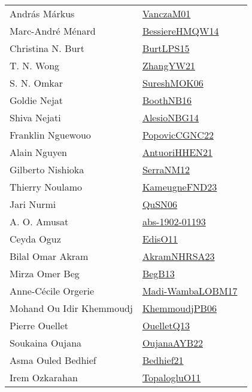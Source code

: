 {\begin{longtable}{p{4cm}p{20cm}}
Andr{\'{a}}s M{\'{a}}rkus & \href{works/VanczaM01.pdf}{VanczaM01}~\cite{VanczaM01}\\
Marc{-}Andr{\'{e}} M{\'{e}}nard & \href{works/BessiereHMQW14.pdf}{BessiereHMQW14}~\cite{BessiereHMQW14}\\
Christina N. Burt & \href{works/BurtLPS15.pdf}{BurtLPS15}~\cite{BurtLPS15}\\
T. N. Wong & \href{works/ZhangYW21.pdf}{ZhangYW21}~\cite{ZhangYW21}\\
S. N. Omkar & \href{}{SureshMOK06}~\cite{SureshMOK06}\\
Goldie Nejat & \href{works/BoothNB16.pdf}{BoothNB16}~\cite{BoothNB16}\\
Shiva Nejati & \href{works/AlesioNBG14.pdf}{AlesioNBG14}~\cite{AlesioNBG14}\\
Franklin Nguewouo & \href{works/PopovicCGNC22.pdf}{PopovicCGNC22}~\cite{PopovicCGNC22}\\
Alain Nguyen & \href{works/AntuoriHHEN21.pdf}{AntuoriHHEN21}~\cite{AntuoriHHEN21}\\
Gilberto Nishioka & \href{works/SerraNM12.pdf}{SerraNM12}~\cite{SerraNM12}\\
Thierry Noulamo & \href{works/KameugneFND23.pdf}{KameugneFND23}~\cite{KameugneFND23}\\
Jari Nurmi & \href{works/QuSN06.pdf}{QuSN06}~\cite{QuSN06}\\
A. O. Amusat & \href{works/abs-1902-01193.pdf}{abs-1902-01193}~\cite{abs-1902-01193}\\
Ceyda Oguz & \href{works/EdisO11.pdf}{EdisO11}~\cite{EdisO11}\\
Bilal Omar Akram & \href{works/AkramNHRSA23.pdf}{AkramNHRSA23}~\cite{AkramNHRSA23}\\
Mirza Omer Beg & \href{}{BegB13}~\cite{BegB13}\\
Anne{-}C{\'{e}}cile Orgerie & \href{works/Madi-WambaLOBM17.pdf}{Madi-WambaLOBM17}~\cite{Madi-WambaLOBM17}\\
Mohand Ou Idir Khemmoudj & \href{works/KhemmoudjPB06.pdf}{KhemmoudjPB06}~\cite{KhemmoudjPB06}\\
Pierre Ouellet & \href{works/OuelletQ13.pdf}{OuelletQ13}~\cite{OuelletQ13}\\
Soukaina Oujana & \href{works/OujanaAYB22.pdf}{OujanaAYB22}~\cite{OujanaAYB22}\\
Asma Ouled Bedhief & \href{works/Bedhief21.pdf}{Bedhief21}~\cite{Bedhief21}\\
Irem Ozkarahan & \href{works/TopalogluO11.pdf}{TopalogluO11}~\cite{TopalogluO11}\\

\end{longtable}}

